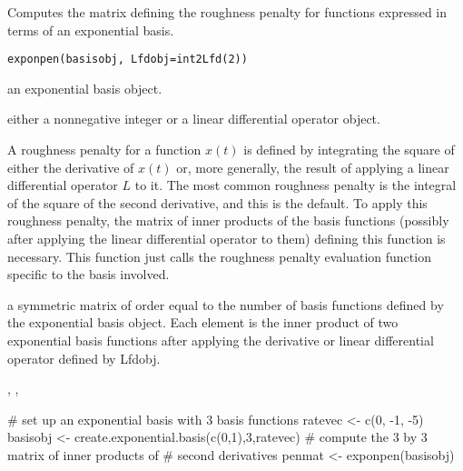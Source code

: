 \documentclass{article}
\begin{document}
\begin{Description}\relax
Computes the matrix defining the roughness penalty for functions
expressed in terms of an exponential basis.
\end{Description}
\begin{Usage}
\begin{verbatim}
exponpen(basisobj, Lfdobj=int2Lfd(2))
\end{verbatim}
\end{Usage}
\begin{Arguments}
\begin{ldescription}
\item[\code{basisobj}] an exponential basis object.

\item[\code{Lfdobj}] either a nonnegative integer or a linear differential operator object.

\end{ldescription}
\end{Arguments}
\begin{Details}\relax
A roughness penalty for a function $x(t)$ is defined by
integrating the square of either the derivative of  $ x(t) $ or,
more generally, the result of applying a linear differential operator
$L$ to it.  The most common roughness penalty is the integral of
the square of the second derivative, and
this is the default. To apply this roughness penalty, the matrix of
inner products of the basis functions (possibly after applying the
linear differential operator to them) defining this function
is necessary. This function just calls the roughness penalty evaluation
function specific to the basis involved.
\end{Details}
\begin{Value}
a symmetric matrix of order equal to the number of basis functions
defined by the exponential basis object.  Each element is the inner product
of two exponential basis functions after applying the derivative or linear
differential operator defined by Lfdobj.
\end{Value}
\begin{SeeAlso}\relax
{}, 
, 
\end{SeeAlso}
\begin{Examples}
\begin{ExampleCode}

#  set up an exponential basis with 3 basis functions
ratevec  <- c(0, -1, -5)
basisobj <- create.exponential.basis(c(0,1),3,ratevec)
#  compute the 3 by 3 matrix of inner products of
#  second derivatives
penmat <- exponpen(basisobj)

\end{ExampleCode}
\end{Examples}
\end{document}
